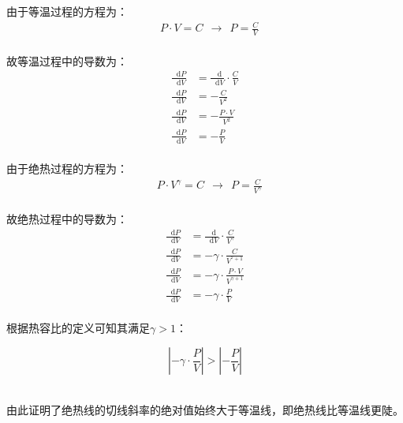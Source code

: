 \documentclass[UTF8]{ctexart}
\newcommand*{\dif}{\mathop{}\!\mathrm{d}}
\begin{document}
    由于等温过程的方程为：
    \begin{align}
        &P\cdot V=C~~\rightarrow~~P=\frac{C}{V}
    \end{align}\\
    故等温过程中的导数为：
    \begin{align}
        \frac{\dif P}{\dif V}&=\frac{\dif}{\dif V}\cdot\frac{C}{V}\\[3mm]
        \frac{\dif P}{\dif V}&=-\frac{C}{V^2}\\[3mm]
        \frac{\dif P}{\dif V}&=-\frac{P\cdot V}{V^2}\\[3mm]
        \frac{\dif P}{\dif V}&=-\frac{P}{V}
    \end{align}\\
    由于绝热过程的方程为：
    \begin{align}
        &P\cdot V^{\gamma}=C~~\rightarrow~~P=\frac{C}{V^{\gamma}}
    \end{align}\\
    故绝热过程中的导数为：
    \begin{align}
        \frac{\dif P}{\dif V}&=\frac{\dif}{\dif V}\cdot\frac{C}{V^{\gamma}}\\[3mm]
        \frac{\dif P}{\dif V}&=-\gamma\cdot\frac{C}{V^{^{\gamma}+1}}\\[3mm]
        \frac{\dif P}{\dif V}&=-\gamma\cdot\frac{P\cdot V}{V^{\gamma+1}}\\[3mm]
        \frac{\dif P}{\dif V}&=-\gamma\cdot\frac{P}{V}
    \end{align}\\
    根据热容比的定义可知其满足$\gamma>1$：\vspace{3pt}
    \begin{large}
        \begin{equation*}
            \left|-\gamma\cdot\frac{P}{V}\right|>\left|-\frac{P}{V}\right|
        \end{equation*}
    \end{large}\\
    由此证明了绝热线的切线斜率的绝对值始终大于等温线，即绝热线比等温线更陡。
\end{document}
